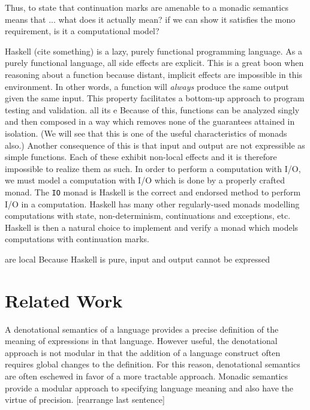 \documentclass[ms]{byuprop}
\begin{document}


Thus, to state that continuation marks are amenable to a monadic semantics means that ... what does it actually mean? if we can show it satisfies the mono requirement, is it a computational model?

Haskell (cite something) is a lazy, purely functional programming 
language. As a purely functional language, all side effects are 
explicit. This is a great boon when reasoning about a function 
because distant, implicit effects are impossible in this environment. In 
other words, a function will \emph{always} produce the same output given 
the same input.
This property facilitates a bottom-up approach to program testing and validation. all its e 
Because of this, functions can be analyzed singly and then 
composed in a way which removes none of the guarantees attained in 
isolation. (We will see that this is one of the useful characteristics 
of monads also.)
Another consequence of this is that input and output are not expressible 
as simple functions. Each of these exhibit non-local effects and it is 
therefore impossible to realize them as such. In order to perform a 
computation with I/O, we must model a computation with I/O which is done 
by a properly crafted monad. The \texttt{IO} monad is Haskell is the 
correct and endorsed method to perform I/O in a computation. Haskell 
has many other regularly-used monads modelling computations with 
state, non-determinism, continuations and exceptions, etc. Haskell is 
then a natural choice to implement and verify a monad which models 
computations with continuation marks.

are local 
Because 
Haskell is 
pure, input and 
output cannot be expressed

\section{Related Work}

A denotational semantics of a language provides a precise definition of the meaning of expressions in that language. However useful, the denotational approach is not modular in that the addition of a language construct often requires global changes to the definition. For this reason, denotational semantics are often eschewed in favor of a more tractable approach. Monadic semantics provide a modular approach to specifying language meaning and also have the virtue of precision. [rearrange last sentence]
\end{document}
